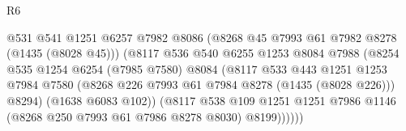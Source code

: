\begin{lexlean}{R6}
\begin{coremodule}
                                              @531
                                              @541
                                              @1251
                                              @6257
                                              @7982
                                              @8086
                                              (@8268 @45 @7993 @61 @7982 @8278 (@1435 (@8028 @45)))
                                              (@8117
                                                @536
                                                @540
                                                @6255
                                                @1253
                                                @8084
                                                @7988
                                                (@8254
                                                  @535
                                                  @1254
                                                  @6254
                                                  (@7985 @7580)
                                                  @8084
                                                  (@8117
                                                    @533
                                                    @443
                                                    @1251
                                                    @1253
                                                    @7984
                                                    @7580
                                                    (@8268
                                                      @226
                                                      @7993
                                                      @61
                                                      @7984
                                                      @8278
                                                      (@1435 (@8028 @226)))
                                                    @8294)
                                                  (@1638 @6083 @102))
                                                (@8117
                                                  @538
                                                  @109
                                                  @1251
                                                  @1251
                                                  @7986
                                                  @1146
                                                  (@8268 @250 @7993 @61 @7986 @8278 @8030)
                                                  @8199))))))

\end{coremodule}
\end{lexlean}

